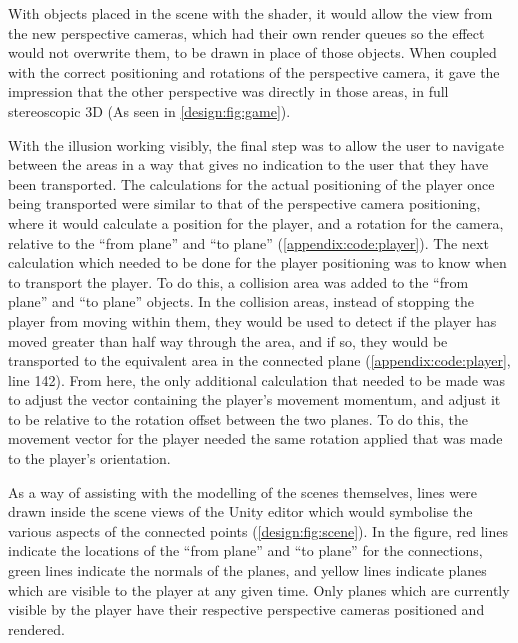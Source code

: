 		With objects placed in the scene with the shader, it would allow the view from the new perspective cameras, which had their own render queues so the effect would not overwrite them, to be drawn in place of those objects.
		When coupled with the correct positioning and rotations of the perspective camera, it gave the impression that the other perspective was directly in those areas, in full stereoscopic 3D (As seen in \autoref{design:fig:game}).

		With the illusion working visibly, the final step was to allow the user to navigate between the areas in a way that gives no indication to the user that they have been transported.
		The calculations for the actual positioning of the player once being transported were similar to that of the perspective camera positioning, where it would calculate a position for the player, and a rotation for the camera, relative to the \enquote{from plane} and \enquote{to plane} (\autoref{appendix:code:player}).
		The next calculation which needed to be done for the player positioning was to know when to transport the player.
		To do this, a collision area was added to the \enquote{from plane} and \enquote{to plane} objects.
		In the collision areas, instead of stopping the player from moving within them, they would be used to detect if the player has moved greater than half way through the area, and if so, they would be transported to the equivalent area in the connected plane (\autoref{appendix:code:player}, line 142).
		From here, the only additional calculation that needed to be made was to adjust the vector containing the player's movement momentum, and adjust it to be relative to the rotation offset between the two planes.
		To do this, the movement vector for the player needed the same rotation applied that was made to the player's orientation.

		As a way of assisting with the modelling of the scenes themselves, lines were drawn inside the scene views of the Unity editor which would symbolise the various aspects of the connected points (\autoref{design:fig:scene}).
		In the figure, red lines indicate the locations of the \enquote{from plane} and \enquote{to plane} for the connections, green lines indicate the normals of the planes, and yellow lines indicate planes which are visible to the player at any given time.
		Only planes which are currently visible by the player have their respective perspective cameras positioned and rendered.

